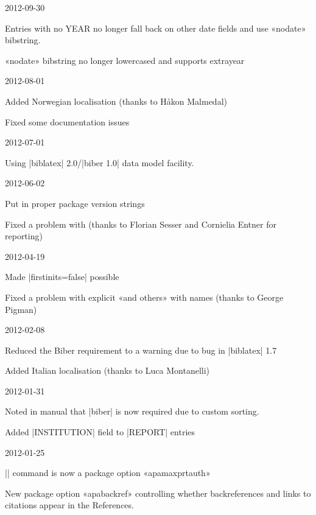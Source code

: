 \documentclass{ltxdockit}
\begin{document}
\begin{changelog}
\begin{release}{5.2}{2012-09-30}
\item Entries with no YEAR no longer fall back on other date fields
  and use «nodate» bibstring.
\item «nodate» bibstring no longer lowercased and supports extrayear
\end{release}

\begin{release}{5.1}{2012-08-01}
\item Added Norwegian localisation (thanks to Håkon Malmedal)
\item Fixed some documentation issues
\end{release}

\begin{release}{5.0}{2012-07-01}
\item Using |biblatex| 2.0/|biber 1.0| data model facility.
\end{release}

\begin{release}{4.8}{2012-06-02}
\item Put in proper package version strings
\item Fixed a problem with  (thanks to Florian Sesser and
  Cornielia Entner for reporting)
\end{release}

\begin{release}{4.7}{2012-04-19}
\item Made |firstinits=false| possible
\item Fixed a problem with explicit «and others» with names (thanks to
  George Pigman)
\end{release}

\begin{release}{4.6}{2012-02-08}
\item Reduced the Biber requirement to a warning due to bug in |biblatex| 1.7
\item Added Italian localisation (thanks to Luca Montanelli)
\end{release}

\begin{release}{4.5}{2012-01-31}
\item Noted in manual that |biber| is now required due to custom sorting.
\item Added |INSTITUTION| field to |REPORT| entries
\end{release}

\begin{release}{4.4}{2012-01-25}
\item |\maxprtauth| command is now a package option «apamaxprtauth»
\item New package option «apabackref» controlling whether
  backreferences and links to citations appear in the References.
\end{release}


\end{changelog}
\end{document}

